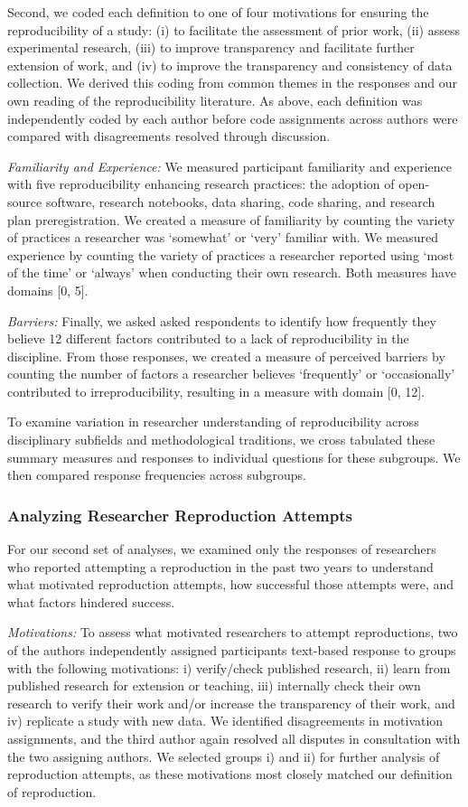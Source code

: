 \documentclass[]{interact}
\theoremstyle{plain}%
\theoremstyle{definition}
\theoremstyle{remark}
\begin{document}
Second, we coded each definition to one of four motivations for ensuring the reproducibility of a study: (i) to facilitate the assessment of prior work, (ii) assess experimental research, (iii) to improve transparency and facilitate further extension of work, and (iv) to improve the transparency and consistency of data collection.
We derived this coding from common themes in the responses and our own reading of the reproducibility literature.
As above, each definition was independently coded by each author before code assignments across authors were compared with disagreements resolved through discussion.

\textit{Familiarity and Experience:} We measured participant familiarity and experience with five reproducibility enhancing research practices: the adoption of open-source software, research notebooks, data sharing, code sharing, and research plan preregistration. 
We created a measure of familiarity by counting the variety of practices a researcher was `somewhat' or `very' familiar with.
We measured experience by counting the variety of practices a researcher reported using `most of the time' or `always' when conducting their own research. 
Both measures have domains [0, 5]. 

\textit{Barriers:} Finally, we asked asked respondents to identify how frequently they believe 12 different factors contributed to a lack of reproducibility in the discipline. 
From those responses, we created a measure of perceived barriers by counting the number of factors a researcher believes `frequently' or `occasionally' contributed to irreproducibility, resulting in a measure with domain [0, 12].

To examine variation in researcher understanding of reproducibility across disciplinary subfields and methodological traditions, we cross tabulated these summary measures and responses to individual questions for these subgroups. 
We then compared response frequencies across subgroups.

\subsubsection*{Analyzing Researcher Reproduction Attempts}
\noindent For our second set of analyses, we examined only the responses of researchers who reported attempting a reproduction in the past two years to understand what motivated reproduction attempts, how successful those attempts were, and what factors hindered success.

\textit{Motivations:} To assess what motivated researchers to attempt reproductions, two of the authors independently assigned participants text-based response to groups with the following motivations: i) verify/check published research, ii) learn from published research for extension or teaching, iii) internally check their own research to verify their work and/or increase the transparency of their work, and iv) replicate a study with new data.
We identified disagreements in motivation assignments, and the third author again resolved all disputes in consultation with the two assigning authors.
We selected groups i) and ii) for further analysis of reproduction attempts, as these motivations most closely matched our definition of reproduction. 
\end{document}
